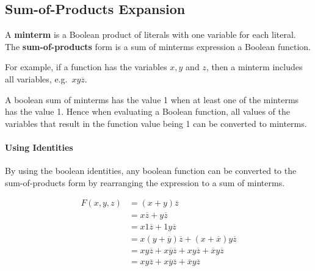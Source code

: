 		\subsection{Sum-of-Products Expansion}

		A \textbf{minterm} is a Boolean product of literals with one variable for each literal. The \textbf{sum-of-products} form is a sum of minterms expression a Boolean function.

		For example, if a function has the variables \( x, y \) and \( z \), then a minterm includes all variables, e.g.\ \( xy \overline{z} \).

		A boolean sum of minterms has the value 1 when at least one of the minterms has the value 1. Hence when evaluating a Boolean function, all values of the variables that result in the function value being 1 can be converted to minterms.

		\paragraph{Using Identities}

		By using the boolean identities, any boolean function can be converted to the sum-of-products form by rearranging the expression to a sum of minterms.

		\begin{align*}
			F(x,y,z)	&= (x+y) \overline{z} \\
						&= x\overline{z} + y\overline{z} \tag{Distributive Law} \\
						&= x1\overline{z} + 1y\overline{z} \tag{Identity Law} \\
						&= x(y + \overline{y})\overline{z} + (x + \overline{x})y\overline{z} \tag{Unit Property} \\
						&= xy\overline{z} + x\overline{y}\overline{z} + xy\overline{z} + \overline{x}y\overline{z} \tag{Distributive Law} \\
						&= xy\overline{z} + x\overline{y}\overline{z} + \overline{x}y\overline{z} \tag{Idempotent Law} \\
		\end{align*}

